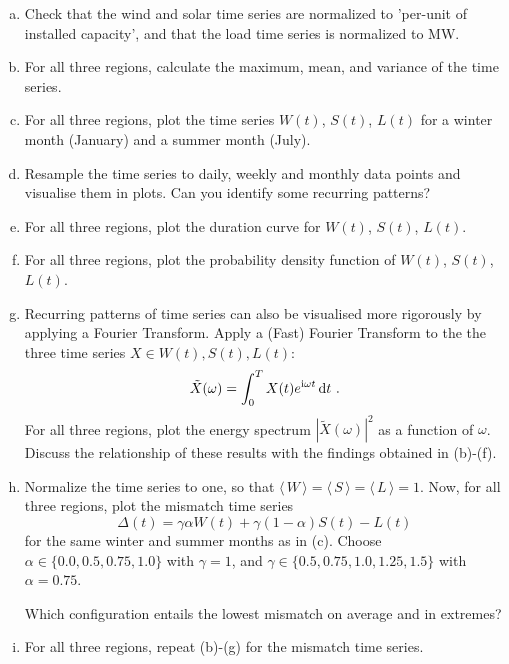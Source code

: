 \documentclass[11pt,a4paper,fleqn]{scrartcl}
\renewcommand{\i}{\mathrm{i}}
\newcommand{\expect}[1]{\langle\,#1\,\rangle}
\newcommand{\ud}[1]{\textup{d}#1\,}
\begin{document}
\begin{enumerate}[(a)]
 \item Check that the wind and solar time series are normalized to 'per-unit of installed \mbox{capacity}', and that the load time series is normalized to MW.
 \item For all three regions, calculate the maximum, mean, and variance of the time series.
 \item For all three regions, plot the time series \(W(t)\),
       \(S(t)\),
       \(L(t)\) for a winter month (January) and a summer month (July).
 \item Resample the time series to daily, weekly and monthly data points and visualise them in plots. Can you identify some recurring patterns? 
 \item For all three regions, plot the duration curve for \(W(t)\), \(S(t)\), \(L(t)\).
 \item For all three regions, plot the probability density function of \(W(t)\), \(S(t)\), \(L(t)\).
 \item Recurring patterns of time series can also be visualised more rigorously by applying a Fourier Transform. Apply a (Fast) Fourier Transform to the the three time series $X \in W(t), S(t), L(t)$:
       \begin{equation*}
        \tilde{X}(\omega) = \int_0^T X(t) e^{\i \omega t} \,\ud t \, .
       \end{equation*}
       For all three regions, plot the energy spectrum
       $\left| \tilde{X}(\omega) \right|^2$ as a function of
       $\omega$. Discuss the relationship of these results with the
       findings obtained in (b)-(f).
 \item Normalize the time series to one, so that \(\expect{W} = \expect{S} = \expect{L} = 1\).
       Now, for all three regions, plot the mismatch time series
       \begin{equation*}
        \Delta(t) = \gamma \alpha W(t) + \gamma (1 - \alpha) S(t) - L(t)
       \end{equation*}
       for the same winter and summer months as in (c). Choose
       \(\alpha \in \{0.0, 0.5, 0.75, 1.0\}\) with \(\gamma = 1\),
       and $\gamma \in \{0.5, 0.75, 1.0, 1.25, 1.5\} $ with $\alpha = 0.75$.
       
       Which configuration entails the lowest mismatch on average and in extremes?       
       
 \item For all three regions, repeat (b)-(g) for the mismatch time series.
\end{enumerate}
\end{document}
